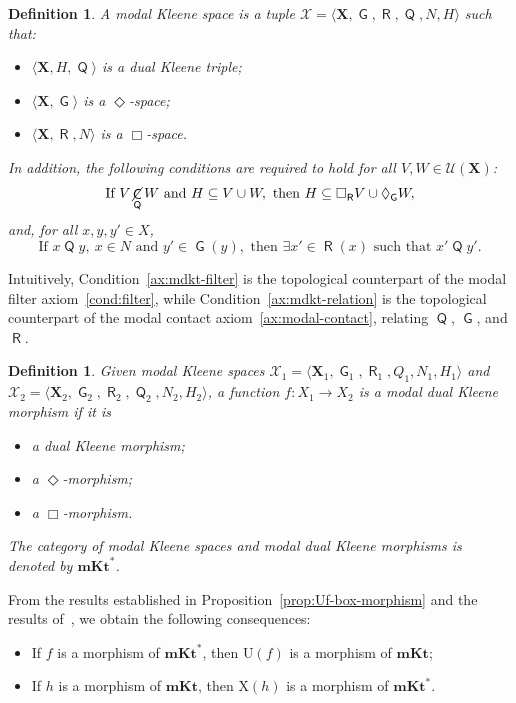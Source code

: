 \documentclass{article}
\newtheorem{definition}[theorem]{Definition}
\DeclareMathOperator{\con}{\mathsf{C}}
\DeclareMathOperator{\notcon}{\cancel{ \con}}
\DeclareMathOperator{\Q}{\mathsf{Q}}
\DeclareMathOperator{\G}{\mathsf{G}}
\DeclareMathOperator{\R}{\mathsf{R}}
\newcommand{\X}{\mathbf{X}}
\newcommand{\U}{\mathcal{U}}
\begin{document}
\begin{definition}
\label{def:modal-dual-kleene-triple}
A \emph{modal Kleene space} is a tuple $\mathcal{X}=\langle \X,\G,\R,\Q,N,H\rangle$ such that:
\begin{itemize}
    \item $\langle \X, H, \Q \rangle$ is a dual Kleene triple;
    \item $\langle \X, \G \rangle$ is a $\Diamond$-space;
    \item $\langle \X, \R, N \rangle$ is a $\Box$-space.
\end{itemize}
In addition, the following conditions are required to hold for all $V, W \in \U(\X)$:
\begin{equation}
\label{ax:mdkt-filter}
\text{If } V \notcon_{\Q} W \text{ and } H \subseteq V \cup W, \text{ then } H \subseteq \Box_{\R} V \cup \Diamond_{\G} W,
\end{equation}
and, for all $x, y, y' \in X$,
\begin{equation}
\label{ax:mdkt-relation}
\text{If } x\Q y,\ x \in N \text{ and } y' \in \G(y), \text{ then } \exists x' \in \R(x) \text{ such that } x'\Q y'.
\end{equation}
\end{definition}

Intuitively, Condition~\eqref{ax:mdkt-filter} is the topological counterpart of the modal filter axiom~\eqref{cond:filter}, while Condition~\eqref{ax:mdkt-relation} is the topological counterpart of the modal contact axiom~\eqref{ax:modal-contact}, relating $\Q$, $\G$, and $\R$.

\begin{definition}
\label{def:mdkt-morphism}
Given modal Kleene spaces $\mathcal{X}_1=\langle \X_1,\G_1,\R_1,Q_1,N_1,H_1\rangle$ and $\mathcal{X}_2=\langle \X_2,\G_2,\R_2,\Q_2,N_2,H_2\rangle$, a function $f\colon X_1\to X_2$ is a \emph{modal dual Kleene morphism} if it is
\begin{itemize}
    \item a dual Kleene morphism;
    \item a $\Diamond$-morphism;
    \item a $\Box$-morphism.
\end{itemize}

The category of modal Kleene spaces and modal dual Kleene morphisms is denoted by $\mathbf{mKt}^{*}$.
\end{definition}

From the results established in Proposition~\ref{prop:Uf-box-morphism} and the results of~\cite{jalali, petrovich1996}, we obtain the following consequences:
\begin{itemize}
    \item If $f$ is a morphism of $\mathbf{mKt}^{*}$, then $\mathrm{U}(f)$ is a morphism of $\mathbf{mKt}$;
    \item If $h$ is a morphism of $\mathbf{mKt}$, then $\mathrm{X}(h)$ is a morphism of $\mathbf{mKt}^{*}$.
\end{itemize}
\end{document}

